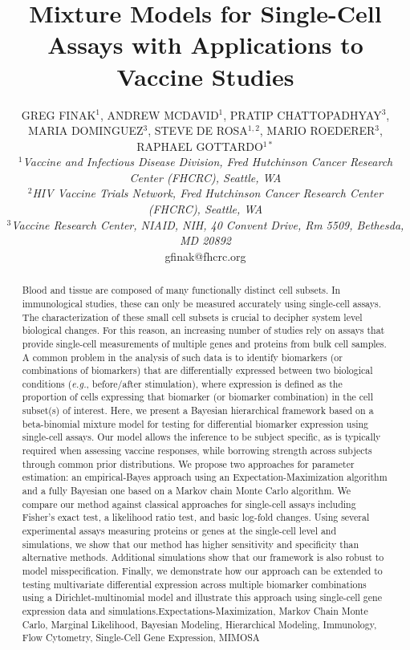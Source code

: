 \documentclass[12pt,oupdraft]{biostatistics}
\title{Mixture Models for Single-Cell Assays with Applications to Vaccine Studies}
\author{GREG FINAK$^{1}$, 
 ANDREW MCDAVID$^{1}$,
 PRATIP CHATTOPADHYAY$^{3}$,
 MARIA DOMINGUEZ$^{3}$,
 STEVE DE ROSA$^{1,2}$,
 MARIO ROEDERER$^{3}$,\\
 RAPHAEL GOTTARDO$^{1\ast}$
 \\[4pt]
\textit{ $^{1}$Vaccine and Infectious Disease Division, Fred Hutchinson Cancer Research Center (FHCRC), Seattle, WA\\
 $^{2}$HIV Vaccine Trials Network, Fred Hutchinson Cancer Research Center (FHCRC), Seattle, WA\\
 $^{3}$Vaccine Research Center, NIAID, NIH, 40 Convent Drive, Rm 5509, Bethesda, MD 20892}
 \\[2pt]
 {gfinak@fhcrc.org}}
\date{}
\begin{document}




\maketitle
{}

\begin{abstract}
{Blood and tissue are composed of many functionally distinct cell subsets. In immunological studies, these can only be measured accurately using single-cell assays. The characterization of these small cell subsets is crucial to decipher system level biological changes. For this reason, an increasing number of studies rely on assays that provide single-cell measurements of multiple genes and proteins from bulk cell samples. A common problem in the analysis of such data is to identify biomarkers (or combinations of biomarkers) that are differentially expressed between two biological conditions (\textit{e.g.}, before/after stimulation), where expression is defined as the proportion of cells expressing that biomarker (or biomarker combination) in the cell subset(s) of interest.
Here, we present a Bayesian hierarchical framework based on a beta-binomial mixture model for testing for differential biomarker expression using single-cell assays. Our model allows the inference to be subject specific, as is typically required when assessing vaccine responses, while borrowing strength across subjects through common prior distributions. We propose two approaches for parameter estimation: an empirical-Bayes approach using an Expectation-Maximization algorithm and a fully Bayesian one based on a Markov chain Monte Carlo algorithm. We compare our method against classical approaches for single-cell assays including Fisher's exact test, a likelihood ratio test, and basic log-fold changes. Using several experimental assays measuring proteins or genes at the single-cell level and simulations, we show that our method has higher sensitivity and specificity than alternative methods. Additional simulations show that our framework is also robust to model misspecification. Finally, we demonstrate how our approach can be extended to testing multivariate differential expression across multiple biomarker combinations using a Dirichlet-multinomial model and illustrate this approach using single-cell gene expression data and simulations.}{Expectations-Maximization, Markov Chain Monte Carlo,
Marginal Likelihood, Bayesian Modeling, Hierarchical Modeling,
Immunology, Flow Cytometry, Single-Cell Gene Expression, MIMOSA}
\end{abstract}
\end{document}
